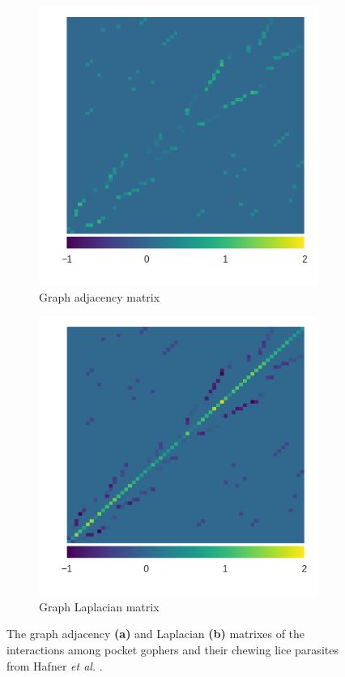 
\begin{figure}
    \centering
    \begin{subfigure}[b]{0.45\textwidth}
        \includegraphics[width=\textwidth]{FishPoo/figures/gopher_louse_adjacency}
        \small
        \caption{Graph adjacency matrix}
    \end{subfigure}
    \begin{subfigure}[b]{0.45\textwidth}
        \includegraphics[width=\textwidth]{FishPoo/figures/gopher_louse_laplacian}
        \small
        \caption{Graph Laplacian matrix}
    \end{subfigure}
    \caption{The graph adjacency \textbf{(a)} and Laplacian \textbf{(b)} matrixes of the interactions among pocket gophers and their chewing lice parasites from Hafner {\em et al.} \cite{hafner1994disparate}.}
    \label{fig:FP_ajlp}
\end{figure}